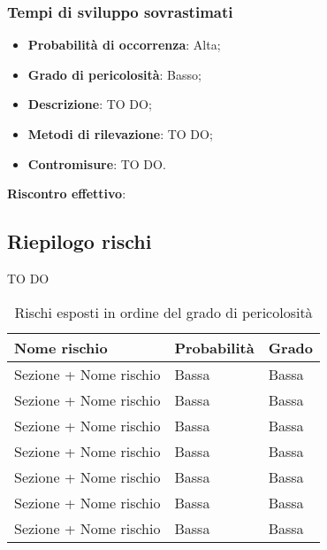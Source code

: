 		\subsubsection{Tempi di sviluppo sovrastimati} %
		\label{ssub:tempi_di_sviluppo_sovrastimati}
			\begin{itemize}
				\item \textbf{Probabilità di occorrenza}: Alta;
				\item \textbf{Grado di pericolosità}: Basso;
				\item \textbf{Descrizione}: TO DO;
				\item \textbf{Metodi di rilevazione}: TO DO;
				\item \textbf{Contromisure}: TO DO.
			\end{itemize}
		\noindent
		\textbf{Riscontro effettivo}: \\
		
	
	\subsection{Riepilogo rischi} %
	\label{sub:riepilogo_rischi}
	TO DO
		\begin{table}[!h]
			\begin{center}
				\begin{tabularx}{0.7\textwidth}{|l|X|X|}
					\hline
					\textbf{Nome rischio} & \textbf{Probabilità} & \textbf{Grado} \\
					\hline
					Sezione + Nome rischio &
					Bassa &
					Bassa \\
					\hline
					Sezione + Nome rischio &
					Bassa &
					Bassa \\
					\hline
					Sezione + Nome rischio &
					Bassa &
					Bassa \\
					\hline
					Sezione + Nome rischio &
					Bassa &
					Bassa \\
					\hline
					Sezione + Nome rischio &
					Bassa &
					Bassa \\
					\hline
					Sezione + Nome rischio &
					Bassa &
					Bassa \\
					\hline
					Sezione + Nome rischio &
					Bassa &
					Bassa \\
					\hline			
				\end{tabularx}
			\end{center}
		\caption{Rischi esposti in ordine del grado di pericolosità}
		\end{table}
		
	
